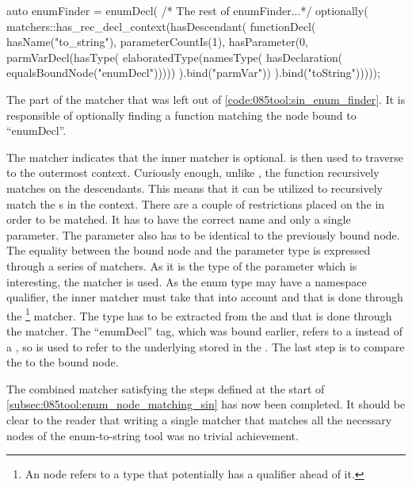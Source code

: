 \begin{listing}[H]
    \begin{cppcode}
auto enumFinder = enumDecl(
  /* The rest of enumFinder...*/
  optionally(
    matchers::has_rec_decl_context(hasDescendant(
      functionDecl(
        hasName("to_string"),
        parameterCountIs(1),
        hasParameter(0,
          parmVarDecl(hasType(
            elaboratedType(namesType(
              hasDeclaration(
                equalsBoundNode("enumDecl")))))
          ).bind("parmVar"))
      ).bind("toString")))));
    \end{cppcode}
    \caption{The part of the  matcher that was left out of \cref{code:085tool:sin_enum_finder}. It is responsible of optionally finding a  function matching the  node bound to ``enumDecl''.}
    \label{code:085tool:has_enum_to_string}
\end{listing}

The  matcher indicates that the inner matcher is optional.  is then used to traverse to the outermost context.
Curiously enough, unlike , the  function recursively matches on the descendants. This means that it can be utilized to recursively match the s in the context.
There are a couple of restrictions placed on the  in order to be matched. It has to have the correct name and only a single parameter. The parameter also has to be identical to the previously bound node.
The equality between the bound node and the parameter type is expressed through a series of matchers. As it is the type of the parameter which is interesting, the  matcher is used. As the enum type may have a namespace qualifier, the inner matcher must take that into account and that is done through the \footnote{
    An  node refers to a type that potentially has a qualifier ahead of it.
} matcher.
The type has to be extracted from the  and that is done through the  matcher.
The ``enumDecl'' tag, which was bound earlier, refers to a  instead of a , so  is used to refer to the underlying  stored in the . The last step is to compare the  to the bound node.

The combined matcher satisfying the steps defined at the start of \cref{subsec:085tool:enum_node_matching_sin} has now been completed.
It should be clear to the reader that writing a single matcher that matches all the necessary nodes of the enum-to-string tool was no trivial achievement.

